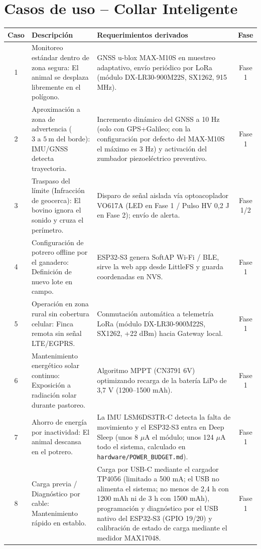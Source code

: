 \section*{Casos de uso -- Collar Inteligente}

\begin{table}[H]
\centering
\small
\begin{tabularx}{\textwidth}{|c X X c|}
\hline
\rowcolor{categorybg}
\textbf{Caso} & \textbf{Descripción} & \textbf{Requerimientos derivados} & \textbf{Fase} \\ \hline
1 & Monitoreo estándar dentro de zona segura: El animal se desplaza libremente en el polígono. & GNSS u-blox MAX-M10S en muestreo adaptativo, envío periódico por LoRa (módulo DX-LR30-900M22S, SX1262, 915 MHz). & Fase 1 \\ \hline
2 & Aproximación a zona de advertencia ($3\text{ a }5~\text{m}$ del borde): IMU/GNSS detecta trayectoria. & Incremento dinámico del GNSS a 10 Hz (solo con GPS+Galileo; con la configuración por defecto del MAX-M10S el máximo es 3 Hz) y activación del zumbador piezoeléctrico preventivo. & Fase 1 \\ \hline
3 & Traspaso del límite (Infracción de geocerca): El bovino ignora el sonido y cruza el perímetro. & Disparo de señal aislada vía optoacoplador VO617A (LED en Fase 1 / Pulso HV 0,2 J en Fase 2); envío de alerta. & Fase 1/2 \\ \hline
4 & Configuración de potrero offline por el ganadero: Definición de nuevo lote en campo. & ESP32-S3 genera SoftAP Wi-Fi / BLE, sirve la web app desde LittleFS y guarda coordenadas en NVS. & Fase 1 \\ \hline
5 & Operación en zona rural sin cobertura celular: Finca remota sin señal LTE/EGPRS. & Conmutación automática a telemetría LoRa (módulo DX-LR30-900M22S, SX1262, +22 dBm) hacia Gateway local. & Fase 1 \\ \hline
\rowcolor{rowalt}
6 & Mantenimiento energético solar continuo: Exposición a radiación solar durante pastoreo. & Algoritmo MPPT (CN3791 6V) optimizando recarga de la batería LiPo de 3,7 V (1200--1500 mAh). & Fase 1 \\ \hline
7 & Ahorro de energía por inactividad: El animal descansa en el potrero. & La IMU LSM6DS3TR-C detecta la falta de movimiento y el ESP32-S3 entra en Deep Sleep (unos 8 $\mu$A el módulo; unos 124 $\mu$A todo el sistema, calculado en \texttt{hardware/POWER\_BUDGET.md}). & Fase 1 \\ \hline
8 & Carga previa / Diagnóstico por cable: Mantenimiento rápido en establo. & Carga por USB-C mediante el cargador TP4056 (limitado a 500 mA; el USB no alimenta el sistema; no menos de 2,4 h con 1200 mAh ni de 3 h con 1500 mAh), programación y diagnóstico por el USB nativo del ESP32-S3 (GPIO 19/20) y calibración de estado de carga mediante el medidor MAX17048. & Fase 1 \\ \hline

\end{tabularx}
\end{table}
